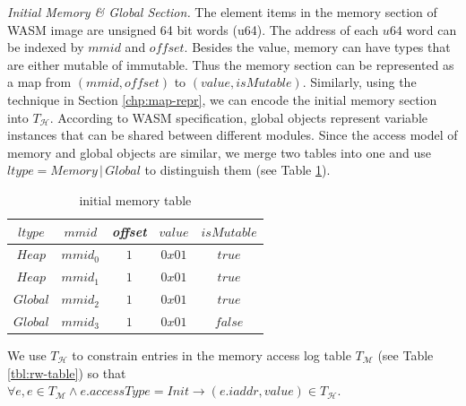\noindent\emph{Initial Memory \& Global Section.}
The element items in the memory section of WASM image are unsigned 64 bit words (u64). The address of each $u64$ word can be indexed by $mmid$ and $offset$. Besides the value, memory can have types that are either mutable of immutable. Thus the memory section can be represented as a map from $(mmid, offset)$ to $(value, isMutable)$. Similarly, using the technique in Section \ref{chp:map-repr}, we can encode the initial memory section into $T_\mathcal{H}$. According to WASM specification, global objects represent variable instances that can be shared between different modules. Since the access model of memory and global objects are similar, we merge two tables into one and use $ltype = Memory \,|\, Global$ to distinguish them (see Table \ref{tbl:init-memory-table}).
\begin{table}[!h]
\begin{center}
\begin{tabular}{ | c | c | c | c | c | }
  \hline
  $ltype$ & $mmid$ & \emph{offset} & $value$ & $isMutable$ \\
  \hline
  $Heap$ & $mmid_0$ & $1$ & $0x01$ & $true$ \\
  \hline
  $Heap$ & $mmid_1$ & $1$ & $0x01$ & $true$ \\
  \hline
  $Global$ & $mmid_2$ & $1$ & $0x01$ & $true$ \\ 
  \hline
  $Global$ & $mmid_3$ & $1$ & $0x01$ & $false$ \\ 
  \hline
\end{tabular}
\caption{initial memory table}
\label{tbl:init-memory-table}
\end{center}
\end{table}

We use $T_\mathcal{H}$ to constrain entries in the memory access log table $T_\mathcal{M}$ (see Table \ref{tbl:rw-table}) so that $\forall e, e\in T_\mathcal{M} \wedge e.accessType = Init \rightarrow (e.iaddr, value) \in T_\mathcal{H}$.


